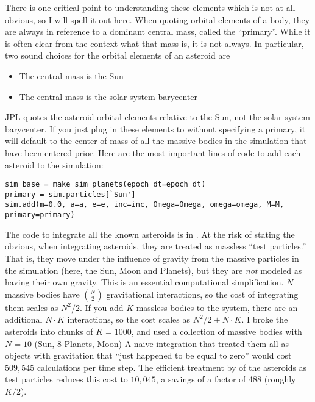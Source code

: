 There is one critical point to understanding these elements which is not at all obvious, so I will spell it out here.
When quoting orbital elements of a body, they are always in reference to a dominant central mass, called the ``primary''.
While it is often clear from the context what that mass is, it is not always.
In particular, two sound choices for the orbital elements of an asteroid are
\begin{samepage}
\begin{itemize}
\item The central mass is the Sun
\item The central mass is the solar system barycenter
\end{itemize}
\end{samepage}
JPL quotes the asteroid orbital elements relative to the Sun, not the solar system barycenter.
If you just plug in these elements to  without specifying a primary, 
it will default to the center of mass of all the massive bodies in the simulation that have been entered prior.
Here are the most important lines of code to add each asteroid to the simulation:
\begin{lstlisting}[style=CodeSnippet]
sim_base = make_sim_planets(epoch_dt=epoch_dt)
primary = sim.particles[`Sun']
sim.add(m=0.0, a=a, e=e, inc=inc, Omega=Omega, omega=omega, M=M, primary=primary)
\end{lstlisting}

The code to integrate all the known asteroids is in .
At the risk of stating the obvious, when integrating asteroids, they are treated as massless ``test particles.''
That is, they move under the influence of gravity from the massive particles in the simulation (here, the Sun, Moon and Planets),
but they are \textit{not} modeled as having their own gravity.
This is an essential computational simplification.
$N$ massive bodies have ${N}\choose{2}$ gravitational interactions, so the cost of integrating them scales as $N^2 / 2$.
If you add $K$ massless bodies to the system, there are an additional $N\cdot K$ interactions, so the cost scales as $N^2 / 2 + N \cdot K$.
I broke the asteroids into chunks of $K=1000$, and used a collection of massive bodies with $N=10$ (Sun, 8 Planets, Moon)
A naive integration that treated them all as objects with gravitation that ``just happened to be equal to zero'' would cost $509,545$ calculations per time step.
The efficient treatment by  of the asteroids as test particles reduces this cost to $10,045$, a savings of a factor of 488 (roughly $K/2$).

